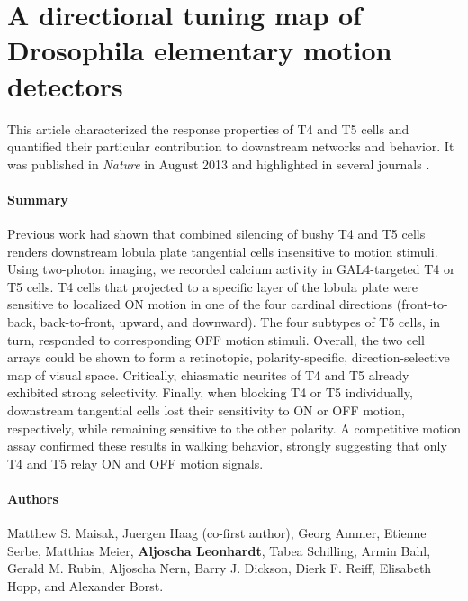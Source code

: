 \section[A directional tuning map of \textit{Drosophila} elementary motion detectors]{A directional tuning map of Drosophila elementary motion detectors}
\label{sct:manuscript_maisak}

This article characterized the response properties of T4 and T5 cells and quantified their particular contribution to downstream networks and behavior. It was published in \textit{Nature} in August 2013 \citep{Maisak:2013kk} and highlighted in several journals \citep{Masland:2013kv,Gilbert:2013aa,Yonehara:2013aa,Flight:2013aa}.

\paragraph{Summary}
Previous work had shown that combined silencing of bushy T4 and T5 cells renders downstream lobula plate tangential cells insensitive to motion stimuli. Using two-photon imaging, we recorded calcium activity in GAL4-targeted T4 or T5 cells. T4 cells that projected to a specific layer of the lobula plate were sensitive to localized ON motion in one of the four cardinal directions (front-to-back, back-to-front, upward, and downward). The four subtypes of T5 cells, in turn, responded to corresponding OFF motion stimuli. Overall, the two cell arrays could be shown to form a retinotopic, polarity-specific, direction-selective map of visual space. Critically, chiasmatic neurites of T4 and T5 already exhibited strong selectivity. Finally, when blocking T4 or T5 individually, downstream tangential cells lost their sensitivity to ON or OFF motion, respectively, while remaining sensitive to the other polarity. A competitive motion assay confirmed these results in walking behavior, strongly suggesting that only T4 and T5 relay ON and OFF motion signals.

\paragraph{Authors}
Matthew S. Maisak, Juergen Haag (co-first author), Georg Ammer, Etienne Serbe, Matthias Meier, \textbf{Aljoscha Leonhardt}, Tabea Schilling, Armin Bahl, Gerald M. Rubin, Aljoscha Nern, Barry J. Dickson, Dierk F. Reiff, Elisabeth Hopp, and Alexander Borst.

